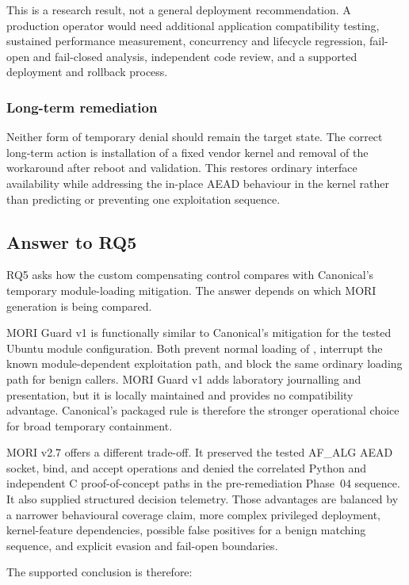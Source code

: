 This is a research result, not a general deployment recommendation. A production
operator would need additional application compatibility testing, sustained
performance measurement, concurrency and lifecycle regression, fail-open and
fail-closed analysis, independent code review, and a supported deployment and
rollback process.

\subsubsection{Long-term remediation}

Neither form of temporary denial should remain the target state. The correct
long-term action is installation of a fixed vendor kernel and removal of the
workaround after reboot and validation. This restores ordinary interface
availability while addressing the in-place AEAD behaviour in the kernel rather
than predicting or preventing one exploitation sequence.

\subsection{Answer to RQ5}

RQ5 asks how the custom compensating control compares with Canonical's temporary
module-loading mitigation. The answer depends on which MORI generation is being
compared.

MORI Guard v1 is functionally similar to Canonical's mitigation for the tested
Ubuntu module configuration. Both prevent normal loading of
, interrupt the known module-dependent exploitation path, and
block the same ordinary loading path for benign callers. MORI Guard v1 adds
laboratory journalling and presentation, but it is locally maintained and
provides no compatibility advantage. Canonical's packaged rule is therefore the
stronger operational choice for broad temporary containment.

MORI v2.7 offers a different trade-off. It preserved the tested AF\_ALG AEAD
socket, bind, and accept operations and denied the correlated Python and
independent C proof-of-concept paths in the pre-remediation Phase~04 sequence.
It also supplied structured decision telemetry. Those advantages are balanced
by a narrower behavioural coverage claim, more complex privileged deployment,
kernel-feature dependencies, possible false positives for a benign matching
sequence, and explicit evasion and fail-open boundaries.

The supported conclusion is therefore:


